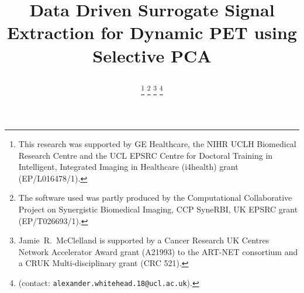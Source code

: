 \documentclass[10pt, twocolumn, twoside, letterpaper]{IEEEtran}
\begin{document}
\title{
    \vspace{-0.75cm}

    Data Driven Surrogate Signal Extraction for Dynamic PET using Selective PCA
}

\pagestyle{plain}

\author{
    \vspace{-0.3cm}
    
        

    \thanks{This research was supported by GE Healthcare, the NIHR UCLH Biomedical Research Centre and the UCL EPSRC Centre for Doctoral Training in Intelligent, Integrated Imaging in Healthcare (i4health) grant (EP/L016478/1).}
    \thanks{The software used was partly produced by the Computational Collaborative Project on Synergistic Biomedical Imaging, CCP SyneRBI, UK EPSRC grant (EP/T026693/1).}
    \thanks{Jamie~R.~McClelland is supported by a Cancer Research UK Centres Network Accelerator Award grant (A21993) to the ART-NET consortium and a CRUK Multi-disciplinary grant (CRC 521).}
    \thanks{(contact: \texttt{alexander.whitehead.18@ucl.ac.uk}).}
}

\maketitle
\IEEEpeerreviewmaketitle
\end{document}
